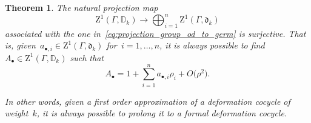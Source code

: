 \documentclass[JEP,XML,SOM,Unicode,published]{cedram}
\let\oldbullet\bullet
\renewcommand{\bullet}{{\scriptscriptstyle\oldbullet}}
\theoremstyle{plain}
\newtheorem{theorem}[theoremcounter]{Theorem}
\theoremstyle{definition}
\newcommand{\tx}{\text}
\newcommand{\bbD}{\ensuremath{\mathbb{D}}}
\newcommand{\frakd}{\ensuremath{\mathfrak{d}}}
\newcommand{\rmZ}{\ensuremath{\mathrm{Z}}}
\let\Ga\Gamma
\begin{document}
\begin{theorem}
\label{thm:extension-of-first-order}
The natural projection map
\begin{equation*}
\rmZ^1(\Ga,\bbD_k)
\to
\bigoplus_{i=1}^n \rmZ^1(\Ga,\frakd_k)
\end{equation*}
associated with the one in~\eqref{eq:projection_group_od_to_germ} is surjective. That is, given~$a_{\bullet,i}\in \rmZ^1(\Gamma, \frakd_k)$ for~$i=1,\ldots,n$, it is always possible to find~$A_\bullet\in \rmZ^1(\Gamma,\bbD_k)$ such that
\begin{equation*}
A_\bullet = 1 + \sum_{i=1}^n a_{\bullet,i} \rho_i + O\bigl(\rho^2\bigr)
\tx{.}
\end{equation*}

In other words, given a first order approximation of a deformation cocycle of weight~$k$, it is always possible to prolong it to a formal deformation cocycle.
\end{theorem}
\end{document}
